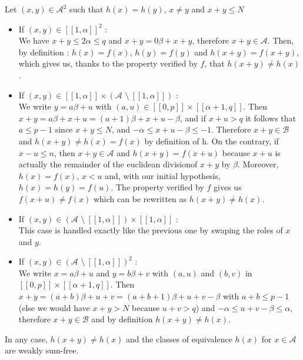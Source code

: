 Let \((x,y) \in \mathcal{A}^2\) such that \(h(x) = h(y)\), \(x \neq y\) and \(x + y \leqslant N\)
\begin{itemize}
	\item If \((x,y) \in [\![1,\alpha]\!]^2\) :\\
	We have \(x + y \leqslant 2\alpha \leqslant q\) and \(x + y = 0\beta + x + y\), therefore \(x + y \in \mathcal{A}\).
Then, by definition : \(h(x) = f(x)\), \(h(y) = f(y)\) and \(h(x+y) = f(x+y)\), which gives us, thanks to the property
verified by \(f\), that \(h(x+y) \neq h(x)\).
	\item If \((x,y) \in [\![1,\alpha]\!] \times ( \mathcal{A} \text{ \textbackslash} ~ [\![1,\alpha]\!] )\) :\\
We write \(y = a\beta + u\) with \((a,u) \in [\![0,p]\!] \times [\![\alpha + 1,q]\!]\). Then \(x+y = a\beta + x + u =
(a+1)\beta + x + u - \beta\),
and if \(x + u > q\) it follows that \(a \leqslant p-1\) since \(x+y \leqslant N\), and \(-\alpha \leqslant x + u -
\beta \leqslant -1\).
Therefore \(x+y \in \mathcal{B}\) and \(h(x+y) \neq h(x) = f(x)\) by definition of h. On the contrary, if \(x - u
\leqslant n\),
then \(x+y \in \mathcal{A}\) and \(h(x+y) = f(x+u)\) because \(x+u\) is actually the remainder of the euclidean
divisionof \(x+y\) by \(\beta\).
Moreover, \(h(x) = f(x)\), \(x < u\) and, with our initial hypothesis, \(h(x) = h(y) = f(u)\). The property verified by
\(f\) gives us \(f(x+u) \neq f(x)\) which can be rewritten as \(h(x+y) \neq h(x)\).
	\item If \((x,y) \in ( \mathcal{A} \text{ \textbackslash} ~ [\![1,\alpha]\!] ) \times [\![1,\alpha]\!]\) : \\
	This case is handled exactly like the previous one by swaping the roles of \(x\) and \(y\).
	\item If \((x,y) \in ( \mathcal{A} \text{ \textbackslash} ~ [\![1,\alpha]\!] )^2\) : \\
We write \(x = a\beta + u\) and \(y = b\beta + v\) with \((a,u)\) and \((b,v)\) in \([\![0,p]\!] \times [\![\alpha +
1,q]\!]\). Then \(x+y = (a+b)\beta + u+v = (a+b+1)\beta + u + v - \beta\)
with \(a+b \leqslant p-1\) (else we would have \(x+y > N\) because \(u+v > q\)) and \(-\alpha \leqslant u + v - \beta
\leqslant \alpha\), therefore \(x+y \in \mathcal{B}\) and by definition \(h(x+y) \neq h(x)\).
\end{itemize}
In any case, \(h(x+y) \neq h(x)\) and the classes of equivalence \(h(x)\) for \(x \in \mathcal{A}\) are weakly
sum-free.\\
\\
